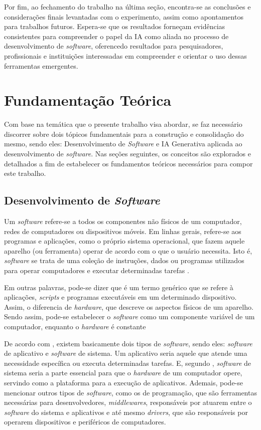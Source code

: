 \documentclass[english,brazilian]{UNISINOSartigo} %
\begin{document}
Por fim, ao fechamento do trabalho na última seção, encontra-se as conclusões e considerações finais levantadas com o experimento, assim como apontamentos para trabalhos futuros. Espera-se que os resultados forneçam evidências consistentes para compreender o papel da IA como aliada no processo de desenvolvimento de \textit{software}, oferencedo resultados para pesquisadores, profissionais e instituições interessadas em compreender e orientar o uso dessas ferramentas emergentes.

\section{Fundamentação Teórica}

Com base na temática que o presente trabalho visa abordar, se faz necessário discorrer sobre dois tópicos fundamentais para a construção e consolidação do mesmo, sendo eles: Desenvolvimento de \textit{Software} e IA Generativa aplicada ao desenvolvimento de \textit{software}. Nas seções seguintes, os conceitos são explorados e detalhados a fim de estabelecer os fundamentos teóricos necessários para compor este trabalho.

\subsection{Desenvolvimento de \textit{Software}}

Um \textit{software} refere-se a todos os componentes não físicos de um computador, redes de computadores ou dispositivos móveis. Em linhas gerais, refere-se aos programas e aplicações, como o próprio sistema operacional, que fazem aquele aparelho (ou ferramenta) operar de acordo com o que o usuário necessita. Isto é, \textit{software} se trata de uma coleção de instruções, dados ou programas utilizados para operar computadores e executar determinadas tarefas \cite{coutinho2021}.

Em outras palavras, pode-se dizer que é um termo genérico que se refere à aplicações, \textit{scripts} e programas executáveis em um determinado dispositivo. Assim, o diferencia de \textit{hardware}, que descreve os aspectos físicos de um aparelho. Sendo assim, pode-se estabelecer o \textit{software} como um componente variável de um computador, enquanto o \textit{hardware} é constante \cite{sakurai2018}

De acordo com , existem basicamente dois tipos de \textit{software}, sendo eles: \textit{software} de aplicativo e \textit{software} de sistema. Um aplicativo seria aquele que atende uma necessidade específica ou executa determinadas tarefas. E, segundo , \textit{software} de sistema seria a parte essencial para que o \textit{hardware} de um computador opere, servindo como a plataforma para a execução de aplicativos. Ademais, pode-se mencionar outros tipos de \textit{software}, como os de programação, que são ferramentas necessárias para desenvolvedores, \textit{middlewares}, responsáveis por atuarem entre o \textit{software} do sistema e aplicativos e até mesmo \textit{drivers}, que são responsáveis por operarem dispositivos e periféricos de computadores.
\end{document}
